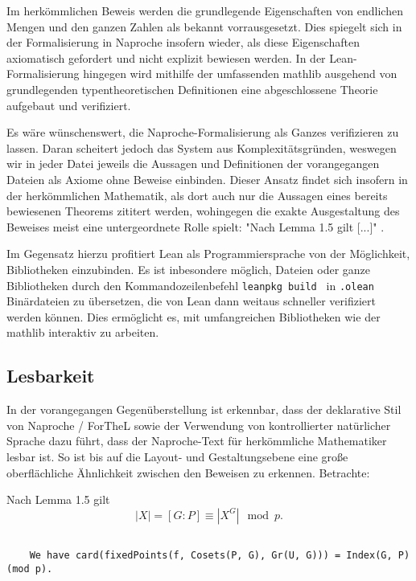 \documentclass[a4paper,12pt]{scrartcl}
\begin{document}
Im herkömmlichen Beweis \cite{bibtex.a}  werden die grundlegende Eigenschaften von endlichen Mengen und den ganzen Zahlen als bekannt vorrausgesetzt. Dies spiegelt sich in der Formalisierung in Naproche insofern wieder, als diese Eigenschaften axiomatisch gefordert und nicht explizit bewiesen werden. In der Lean-Formalisierung hingegen wird mithilfe der umfassenden mathlib ausgehend von grundlegenden typentheoretischen Definitionen eine abgeschlossene Theorie aufgebaut und verifiziert.

Es wäre wünschenswert, die Naproche-Formalisierung als Ganzes verifizieren zu lassen. Daran scheitert jedoch das System aus Komplexitätsgründen, weswegen wir in jeder Datei jeweils die Aussagen und Definitionen der vorangegangen Dateien als Axiome ohne Beweise einbinden. Dieser Ansatz findet sich insofern in der herkömmlichen Mathematik, als dort auch nur die Aussagen eines bereits bewiesenen Theorems zititert werden, wohingegen die exakte Ausgestaltung des Beweises meist eine untergeordnete Rolle spielt: "Nach Lemma 1.5 gilt [...]" \cite{bibtex.a}.

Im Gegensatz hierzu profitiert Lean als Programmiersprache von der Möglichkeit, Bibliotheken einzubinden. Es ist inbesondere möglich, Dateien oder ganze Bibliotheken durch den Kommandozeilenbefehl \verb!leanpkg build ! in  \verb!.olean! Binärdateien zu übersetzen, die von Lean dann weitaus schneller verifiziert werden können. Dies ermöglicht es, mit umfangreichen Bibliotheken wie der mathlib \cite{bibtex.d} interaktiv zu arbeiten.

\subsection{Lesbarkeit}
In der vorangegangen Gegenüberstellung ist erkennbar, dass der deklarative Stil von Naproche / ForTheL sowie der Verwendung von kontrollierter natürlicher Sprache dazu führt, dass der Naproche-Text für herkömmliche Mathematiker lesbar ist. So ist bis auf die Layout- und Gestaltungsebene eine große oberflächliche Ähnlichkeit zwischen den Beweisen zu erkennen.
Betrachte:
\medskip

Nach Lemma 1.5 gilt $$|X|=[G : P]\equiv |X^{G}| \mod p.$$

\begin{lstlisting}

    We have card(fixedPoints(f, Cosets(P, G), Gr(U, G))) = Index(G, P) (mod p).

\end{lstlisting}
\end{document}
